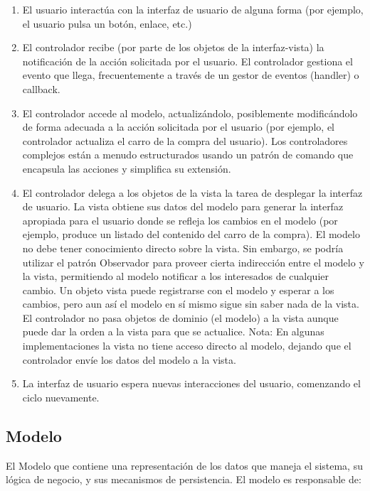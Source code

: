\documentclass[a4paper,12pt]{article}
\begin{document}
\begin{enumerate}
  \item El usuario interactúa con la interfaz de usuario de alguna forma (por 
ejemplo, el usuario pulsa un botón, enlace, etc.)
  \item El controlador recibe (por parte de los objetos de la interfaz-vista) 
la notificación de la acción solicitada por el usuario. El controlador gestiona 
el evento que llega, frecuentemente a través de un gestor de eventos (handler) 
o callback.
  \item El controlador accede al modelo, actualizándolo, posiblemente 
modificándolo de forma adecuada a la acción solicitada por el usuario (por 
ejemplo, el controlador actualiza el carro de la compra del usuario). Los 
controladores complejos están a menudo estructurados usando un patrón de comando 
que encapsula las acciones y simplifica su extensión.
  \item El controlador delega a los objetos de la vista la tarea de desplegar 
la interfaz de usuario. La vista obtiene sus datos del modelo para generar la 
interfaz apropiada para el usuario donde se refleja los cambios en el modelo 
(por ejemplo, produce un listado del contenido del carro de la compra). El 
modelo no debe tener conocimiento directo sobre la vista. Sin embargo, se podría 
utilizar el patrón Observador para proveer cierta indirección entre el modelo y 
la vista, permitiendo al modelo notificar a los interesados de cualquier 
cambio. Un objeto vista puede registrarse con el modelo y esperar a los 
cambios, pero aun así el modelo en sí mismo sigue sin saber nada de la vista. 
El controlador no pasa objetos de dominio (el modelo) a la vista aunque puede 
dar la orden a la vista para que se actualice. Nota: En algunas implementaciones 
la vista no tiene acceso directo al modelo, dejando que el controlador envíe 
los datos del modelo a la vista.
  \item La interfaz de usuario espera nuevas interacciones del usuario, 
comenzando el ciclo nuevamente.

\end{enumerate}

\subsection{Modelo}
El Modelo que contiene una representación de los datos que maneja el sistema, su 
lógica de negocio, y sus mecanismos de persistencia.
El modelo es responsable de:
\end{document}
